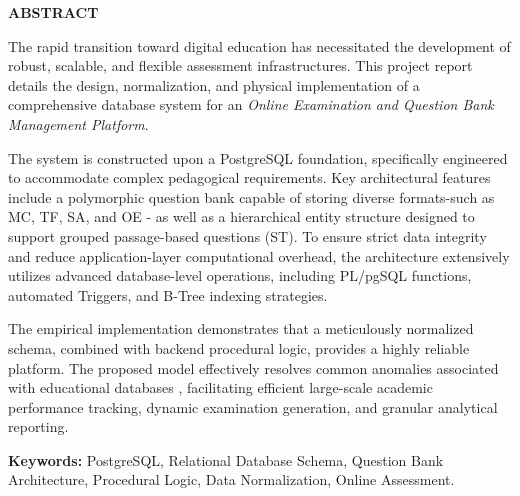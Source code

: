 \documentclass[../report_main.tex]{subfiles}
\begin{document}
\begin{center}
    \Large{\textbf{ABSTRACT}}\\
\end{center}
\vspace{1cm}

The rapid transition toward digital education has necessitated the development of robust, scalable, and flexible assessment infrastructures. This project report details the design, normalization, and physical implementation of a comprehensive database system for an \textit{Online Examination and Question Bank Management Platform}. 

The system is constructed upon a PostgreSQL \cite{postgresql2023} foundation, specifically engineered to accommodate complex pedagogical requirements. Key architectural features include a polymorphic question bank capable of storing diverse formats-such as \gls{MC}, \gls{TF}, \gls{SA}, and \gls{OE} - as well as a hierarchical entity structure designed to support grouped passage-based questions (\gls{ST}). To ensure strict data integrity and reduce application-layer computational overhead, the architecture extensively utilizes advanced database-level operations, including \gls{PL/pgSQL} functions, automated Triggers, and B-Tree indexing strategies.

The empirical implementation demonstrates that a meticulously normalized schema, combined with backend procedural logic, provides a highly reliable platform. The proposed model effectively resolves common anomalies associated with educational databases \cite{silberschatz2019database}, facilitating efficient large-scale academic performance tracking, dynamic examination generation, and granular analytical reporting.

\vspace{1cm}
\noindent\textbf{Keywords:} PostgreSQL, Relational Database Schema, Question Bank Architecture, Procedural Logic, Data Normalization, Online Assessment.
\end{document}
